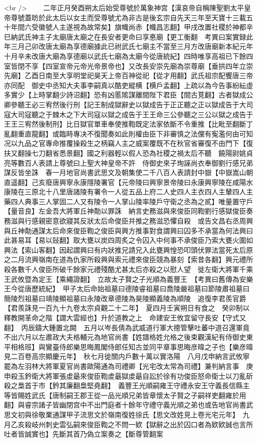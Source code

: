 <br />
　　二年正月癸酉朔太后始受尊號於萬象神宫【漢哀帝自稱陳聖劉太平皇帝尊號蓋昉於此太后以女主而受尊號尤為非古是後玄宗自先天三年至天寶十三載五十年間六受徽號人主遂視為故常矣】旗幟尚赤【幟昌志翻】甲戌改置社稷於神都辛巳納武氏神主子太廟唐太廟之在長安者更命曰享悳廟【更工衡翻　考異曰案實録此年三月己卯改唐太廟為享德廟據此已祔武氏七廟主不當至三月方改唐廟新本紀元年十月辛未改唐大廟為享德廟以武氏七廟為太廟今從唐統紀】四時唯享高祖已下餘四室皆閉不享【四室宣帝元帝光帝景帝也】又改長安崇先廟為崇尊廟【垂拱四年立崇先廟】乙酉日南至大享明堂祀昊天上帝百神從祀【從才用翻】武氏祖宗配饗唐三帝亦同配　御史中丞知大夫事李嗣真以酷吏縱横【横戶孟翻】上疏以為今告事紛紜虛多實少【上時掌翻少詩沼翻】恐有凶慝隂謀離間陛下君臣【間古莧翻】古者獄成公卿參聽王必三宥然後行刑【記王制成獄辭史以獄成告于正正聽之正以獄成告于大司寇大司寇聽之于棘木之下大司寇以獄之成告于王王命三公參聽之三公以獄之成告于王王三宥然後制刑】比日獄官單車奉使推鞫既定法家依斷不令重推【比毗至翻斷丁亂翻重直龍翻】或臨時專决不復聞奏如此則權由臣下非審慎之法儻有寃濫何由可知况以九品之官專命推覆操殺生之柄竊人主之威案覆既不在秋官省審復不由門下【復扶又翻操七刀翻省悉景翻】國之利器輕以假人恐為社稷之禍太后不聽　饒陽尉姚貞亮等數百人表請上尊號曰上聖大神皇帝不許　侍御史來子珣誣尚衣奉御劉行感兄弟謀反皆坐誅　春一月地官尚書武思文及朝集使二千八百人表請封中嶽【中嶽嵩山朝直遥翻】己亥廢唐興寧永康隱陵署官【元帝陵曰興寧景帝陵曰永康興寧陵在咸陽水康陵在三原北十八里唐諸陵有署令一人從五品上府二人史四人主衣四人主輦四人主藥四人典事三人掌固二人又有陵令一人掌山陵率陵戶守衛之丞為之貳】唯量置守戶【量音良】左金吾大將軍丘神勣以罪誅　納言史務滋與來俊臣同鞫劉行感獄俊臣奏務滋與行感親密意欲寢其反狀太后命俊臣并推之務滋恐懼自殺　或告文昌右丞周興與丘神勣通謀太后命來俊臣鞫之俊臣與興方推事對食謂興曰囚多不承當為何法興曰此甚易耳【易以䜴翻】取大甕以炭四周炙之令囚入中何事不承俊臣乃索大甕火圍如興法【索山客翻】因起謂興曰有内狀推兄請兄入此甕興惶恐叩頭伏罪法當死太后原之二月流興嶺南在道為仇家所殺興與索元禮來俊臣競為暴刻【索昔各翻】興元禮所殺各數千人俊臣所破千餘家元禮殘酷尤甚太后亦殺之以慰人望　徙左衛大將軍千乘王武攸暨為定王【乘繩證翻】　立故太子賢之子光順為義豐王　【考異曰舊傳為安樂王今從唐歷統紀】　甲子太后命始祖墓曰德陵睿祖墓曰喬陵嚴祖墓曰節陵肅祖墓曰簡陵烈祖墓曰靖陵顯祖墓曰永陵改章德陵為昊陵顯義陵為順陵　追復李君羨官爵【君羨誅見一百九十九卷太宗貞觀二十二年】　夏四月壬寅朔日有食之　癸卯制以釋教開革命之階【謂大雲經也】升於道教之上　命建安王攸宜留守長安【守式又翻】　丙辰鑄大鍾置北闕　五月以岑長倩為武威道行軍大摠管擊吐蕃中道召還軍竟不出六月以左肅政大夫格輔元為地官尚書【姓譜格姓允格之後束觀漢紀有侍御史東平相格班】與鸞臺侍郎樂思晦鳳閣侍郎任知古並同平章事思晦彦暐之子也【樂彦暐見二百卷高宗顯慶元年】　秋七月徙關内戶數十萬以實洛陽　八月戊申納言武攸寧罷為左羽林大將軍夏官尚書歐陽通為司禮卿【光宅改太常為司禮】兼判納言事　庚申殺玉鈐衛大將軍張䖍朂來俊臣鞫䖍朂獄䖍朂自訟於徐有功俊臣怒命衛士以刀亂斫殺之梟首于市【鈐其廉翻梟堅堯翻】　義豐王光順嗣雍王守禮永安王守義長信縣主等皆賜姓武氏【唐制嗣王郡王從一品光順兄弟皆章懷太子賢之子嗣祥吏翻雍於用翻】與睿宗諸子皆幽閉宫中不出門庭者十餘年守禮守義光順之弟也或告地官尚書武思文初與徐敬業通謀甲子流思文於嶺南復姓徐氏【思文改姓見上卷光宅元年】　九月乙亥殺岐州刺史雲弘嗣來俊臣鞫之不問一欵【獄辭之出於囚口者為欵欵誠也言所吐者皆誠實也】先斷其首乃偽立案奏之【斷尊管翻案